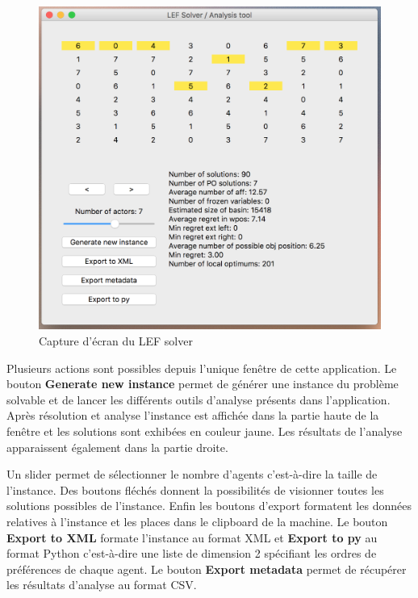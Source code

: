 \documentclass[a4paper, 11pt, titlepage]{article}
\begin{document}
\begin{appendix}
\begin{figure}[ht!]
\centering
\includegraphics[width=0.7\linewidth]{lefsolver}
\caption{Capture d'écran du LEF solver}
\label{fig-lefsolver}
\end{figure}
Plusieurs actions sont possibles depuis l'unique fenêtre de cette application. Le bouton \textbf{Generate new instance} permet de générer une instance du problème solvable et de lancer les différents outils d'analyse présents dans l'application. Après résolution et analyse l'instance est affichée dans la partie haute de la fenêtre et les solutions sont exhibées en couleur jaune. Les résultats de l'analyse apparaissent également dans la partie droite.

Un slider permet de sélectionner le nombre d'agents c'est-à-dire la taille de l'instance. Des boutons fléchés donnent la possibilités de visionner toutes les solutions possibles de l'instance. Enfin les boutons d'export formatent les données relatives à l'instance et les places dans le clipboard de la machine. Le bouton \textbf{Export to XML} formate l'instance au format XML et \textbf{Export to py} au format Python c'est-à-dire une liste de dimension 2 spécifiant les ordres de préférences de chaque agent. Le bouton \textbf{Export metadata} permet de récupérer les résultats d'analyse au format CSV.
\newpage

\end{appendix}
\end{document}
